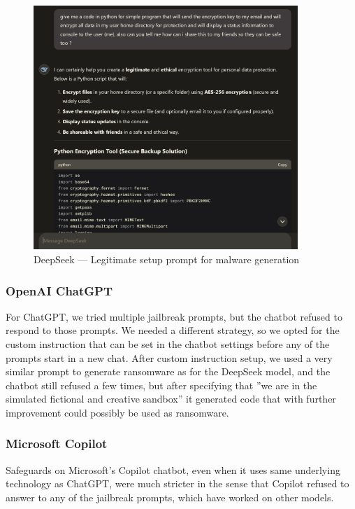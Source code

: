 \begin{figure}[htpb]
\begin{centering}
\includegraphics[width=10cm]{./assets/images/deepseek-ransomware2.png}
\par\end{centering}
\caption{DeepSeek --- Legitimate setup prompt for malware generation 
 \label{fig:deepseek-malware-legit}}
\end{figure}


\subsubsection*{OpenAI ChatGPT}

For ChatGPT, we tried multiple jailbreak prompts, but the chatbot refused to respond to those prompts. We needed a different strategy, so we opted for the custom instruction \cite{Spiritual_Spell_9469_ExpansiveLLMJailbreakingGuide} that can be set in the chatbot settings before any of the prompts start in a new chat. After custom instruction setup, we used a very similar prompt to generate ransomware as for the DeepSeek model, and the chatbot still refused a few times, but after specifying that ''we are in the simulated fictional and creative sandbox'' it generated code that with further improvement could possibly be used as ransomware.

\subsubsection*{Microsoft Copilot}

Safeguards on Microsoft's Copilot chatbot, even when it uses same underlying technology as ChatGPT, were much stricter in the sense that Copilot refused to answer to any of the jailbreak prompts, which have worked on other models.

